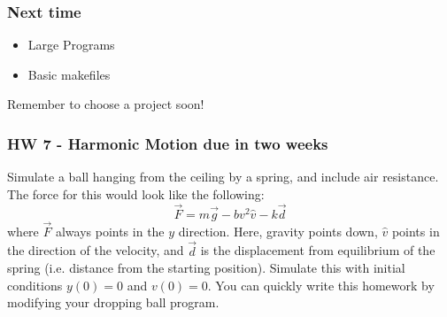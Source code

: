 \documentclass{beamer}
\begin{document}
\begin{frame}
  \frametitle{Next time}
  \begin{itemize}
  \item Large Programs
  \item Basic makefiles
  \end{itemize}
  Remember to choose a project soon!
\end{frame}

\begin{frame}
  \frametitle{HW 7 - Harmonic Motion due in two weeks}
  Simulate a ball hanging from the ceiling by a spring, 
  and include air resistance.
  The force for this would look like the following:
  \begin{equation*}
    \vec{F} = m\vec{g} - bv^2\hat{v} - k\vec{d}
  \end{equation*}
  where $\vec{F}$ always points in the $y$ direction. Here,
  gravity points down, $\hat{v}$ points in the direction
  of the velocity, and $\vec{d}$ is the displacement from
  equilibrium of the spring (i.e. distance from the starting position).
  Simulate this with initial conditions $y(0)=0$ and $v(0)=0$.
  You can quickly write this homework by modifying your dropping ball program.
\end{frame}
\end{document}
